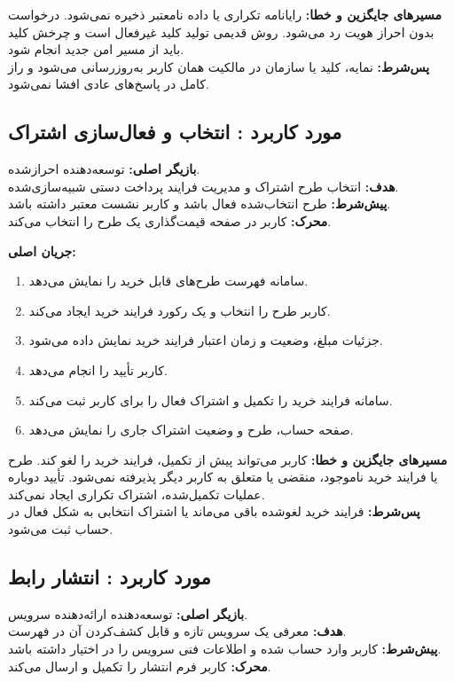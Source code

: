 \noindent\textbf{مسیرهای جایگزین و خطا:}
رایانامه تکراری یا داده نامعتبر ذخیره نمی‌شود. درخواست بدون احراز هویت رد می‌شود. روش قدیمی تولید کلید غیرفعال است و چرخش کلید باید از مسیر امن جدید انجام شود.\\
\textbf{پس‌شرط:} نمایه، کلید یا سازمان در مالکیت همان کاربر به‌روزرسانی می‌شود و راز کامل در پاسخ‌های عادی افشا نمی‌شود.

\UseCaseStart
\subsection{مورد کاربرد : انتخاب و فعال‌سازی اشتراک}
\noindent\textbf{بازیگر اصلی:} توسعه‌دهنده احرازشده.\\
\textbf{هدف:} انتخاب طرح اشتراک و مدیریت فرایند پرداخت دستی شبیه‌سازی‌شده.\\
\textbf{پیش‌شرط:} طرح انتخاب‌شده فعال باشد و کاربر نشست معتبر داشته باشد.\\
\textbf{محرک:} کاربر در صفحه قیمت‌گذاری یک طرح را انتخاب می‌کند.


\noindent\textbf{جریان اصلی:}
\begin{enumerate}
  \item سامانه فهرست طرح‌های قابل خرید را نمایش می‌دهد.
  \item کاربر طرح را انتخاب و یک رکورد فرایند خرید ایجاد می‌کند.
  \item جزئیات مبلغ، وضعیت و زمان اعتبار فرایند خرید نمایش داده می‌شود.
  \item کاربر تأیید را انجام می‌دهد.
  \item سامانه فرایند خرید را تکمیل و اشتراک فعال را برای کاربر ثبت می‌کند.
  \item صفحه حساب، طرح و وضعیت اشتراک جاری را نمایش می‌دهد.
\end{enumerate}

\noindent\textbf{مسیرهای جایگزین و خطا:}
کاربر می‌تواند پیش از تکمیل، فرایند خرید را لغو کند. طرح یا فرایند خرید ناموجود، منقضی یا متعلق به کاربر دیگر پذیرفته نمی‌شود. تأیید دوباره عملیات تکمیل‌شده، اشتراک تکراری ایجاد نمی‌کند.\\
\textbf{پس‌شرط:} فرایند خرید لغوشده باقی می‌ماند یا اشتراک انتخابی به شکل فعال در حساب ثبت می‌شود.

\UseCaseStart
\subsection{مورد کاربرد : انتشار رابط}
\noindent\textbf{بازیگر اصلی:} توسعه‌دهنده ارائه‌دهنده سرویس.\\
\textbf{هدف:} معرفی یک سرویس تازه و قابل کشف‌کردن آن در فهرست.\\
\textbf{پیش‌شرط:} کاربر وارد حساب شده و اطلاعات فنی سرویس را در اختیار داشته باشد.\\
\textbf{محرک:} کاربر فرم انتشار را تکمیل و ارسال می‌کند.

